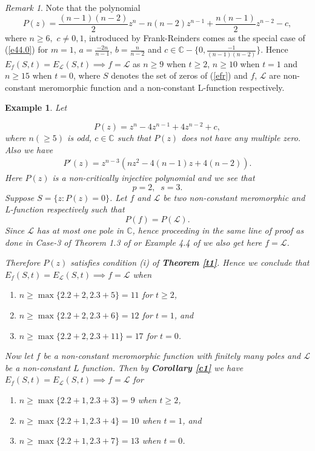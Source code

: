 \documentclass[a4paper,draft]{amsproc}
\theoremstyle{plain}
\newtheorem{exm}{Example}[section]
\theoremstyle{definition}
\theoremstyle{remark}
\newtheorem{rem}{Remark}[section]
\newcommand{\be}{\begin{equation}}
\newcommand{\ee}{\end{equation}}
\newcommand{\bea}{\begin{eqnarray}}
\newcommand{\eea}{\end{eqnarray}}
\numberwithin{equation}{section}
\begin{document}
\begin{rem}
	Note that the polynomial \be\label{efr}P(z)=\frac{(n-1)(n-2)}{2}z^n-n(n-2)z^{n-1}+\frac{n(n-1)}{2}z^{n-2}-c,\ee
	where $n\geq6,$ $c\neq0,1$, introduced by Frank-Reinders \cite{frank1998unique} comes as the special case of (\ref{e44.0}) for $m=1$, $a=\frac{-2n}{n-1}$, $b=\frac{n}{n-2}$ and $c\in\mathbb{C}-\{0,\frac{-1}{(n-1)(n-2)}\}$. Hence $E_f(S, t)=E_{\mathcal{L}}(S,t)\implies f=\mathcal{L}$ as $n\geq 9$ when $t \geq 2$, $n\geq 10$ when $t =1$ and $n\geq 15$ when $t = 0$, where $S$ denotes the set of zeros of (\ref{efr}) and $f$, $\mathcal{L}$ are non-constant meromorphic function  and a non-constant L-function respectively.
\end{rem}
\begin{exm}
Let

\begin{equation*}
	P(z) = z^n-4z^{n-1}+4z^{n-2}+c,
\end{equation*}
where $n(\geq 5)$ is odd,
$c\in \mathbb{C}$ such that $P(z)$ does not have any multiple zero. Also we have 
\bea\nonumber P'(z)=z^{n-3}\left(nz^2-4(n-1)z+4(n-2)\right).\eea
Here $P(z)$ is a non-critically injective polynomial \cite[see  (1.1)]{smtbilisi} and we see that $$p=2,\;\; s=3.$$ Suppose $S=\{z:P(z)=0\}$. 
Let $f$ and $\mathcal{L}$ be two non-constant meromorphic  and L-function respectively such that $$P(f) = P(\mathcal{L}).$$ Since $\mathcal{L}$ has at most one pole in $\mathbb{C}$, hence proceeding in the same line of proof as done in {\em Case-3 of Theorem 1.3} of \cite{smtbilisi} or {\em Example 4.4} of \cite{smfil21}  we also get here $f=\mathcal{L}$. 

Therefore $P(z)$ satisfies condition (i) of {\em\bf Theorem \ref{t1}}. Hence we conclude that $E_f(S, t)=E_\mathcal{L}(S,t)\implies f=\mathcal{L}$ when  
\begin{enumerate}
	\item $n\geq \max\{2.2+2,2.3+5\}=11$ for $t\geq 2$, 
	\item $n\geq \max\{2.2+2,2.3+6\}=12$ for $t=1$, and
	\item $n\geq \max\{2.2+2,2.3+11\}=17$ for $t=0$.
\end{enumerate}

Now let  $f$ be a non-constant meromorphic function with finitely many poles and $\mathcal{L}$ be a non-constant $L$ function. Then by {\em\bf Corollary \ref{c1}} we have $E_f(S, t)=E_\mathcal{L}(S,t)\implies f=\mathcal{L}$ for  
\begin{enumerate}
	\item $n \geq \max\{ 2.2+1,2.3+3\}=9$ when $t\geq 2 $,
	\item  $n \geq \max\{ 2.2+1,2.3+4\}=10$ when $t=1 $, and
	\item  $n \geq \max\{ 2.2+1,2.3+7\}=13$ when $t=0 $.
\end{enumerate} 
\end{exm}	 
\end{document}
